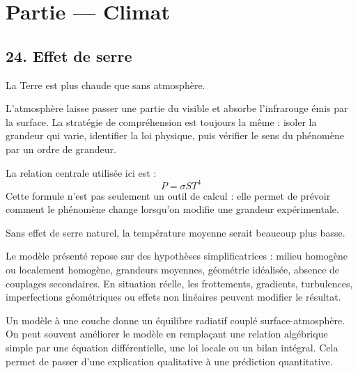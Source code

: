 \documentclass[11pt,a4paper]{article}
\begin{document}
\section{Partie — Climat}


\subsection{24. Effet de serre}

\begin{exemplebox}
La Terre est plus chaude que sans atmosphère.
\end{exemplebox}

\begin{methodebox}
L'atmosphère laisse passer une partie du visible et absorbe l'infrarouge émis par la surface.
La stratégie de compréhension est toujours la même : isoler la grandeur qui varie, identifier la loi physique, puis vérifier le sens du phénomène par un ordre de grandeur.
\end{methodebox}

\begin{theorembox}
La relation centrale utilisée ici est :
\[
P=\sigma S T^4
\]
Cette formule n'est pas seulement un outil de calcul : elle permet de prévoir comment le phénomène change lorsqu'on modifie une grandeur expérimentale.
\end{theorembox}

\begin{odgbox}
Sans effet de serre naturel, la température moyenne serait beaucoup plus basse.
\end{odgbox}

\begin{attentionbox}
Le modèle présenté repose sur des hypothèses simplificatrices : milieu homogène ou localement homogène, grandeurs moyennes, géométrie idéalisée, absence de couplages secondaires. En situation réelle, les frottements, gradients, turbulences, imperfections géométriques ou effets non linéaires peuvent modifier le résultat.
\end{attentionbox}

\begin{approfondissementbox}
Un modèle à une couche donne un équilibre radiatif couplé surface-atmosphère.
On peut souvent améliorer le modèle en remplaçant une relation algébrique simple par une équation différentielle, une loi locale ou un bilan intégral. Cela permet de passer d'une explication qualitative à une prédiction quantitative.
\end{approfondissementbox}
\end{document}
